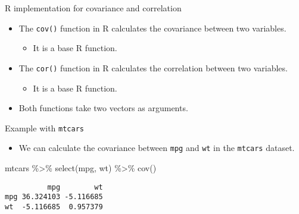 \documentclass[
  10pt,
  ignorenonframetext,
]{beamer}
\newenvironment{Shaded}{\begin{snugshade}}{\end{snugshade}}
\newcommand{\FunctionTok}[1]{\textcolor[rgb]{0.28,0.35,0.67}{#1}}
\newcommand{\NormalTok}[1]{\textcolor[rgb]{0.00,0.23,0.31}{#1}}
\newcommand{\SpecialCharTok}[1]{\textcolor[rgb]{0.37,0.37,0.37}{#1}}
\providecommand{\tightlist}{%
  \setlength{\itemsep}{0pt}\setlength{\parskip}{0pt}}\usepackage{longtable,booktabs,array}
\begin{document}
\begin{frame}[fragile]{R implementation for covariance and correlation}
\label{r-implementation-for-covariance-and-correlation}
\begin{itemize}
\tightlist
\item
  The \texttt{cov()} function in R calculates the covariance between two
  variables.

  \begin{itemize}
  \tightlist
  \item
    It is a base R function.
  \end{itemize}
\item
  The \texttt{cor()} function in R calculates the correlation between
  two variables.

  \begin{itemize}
  \tightlist
  \item
    It is a base R function.
  \end{itemize}
\item
  Both functions take two vectors as arguments.
\end{itemize}
\end{frame}

\begin{frame}[fragile]{Example with \texttt{mtcars}}
\label{example-with-mtcars}
\begin{itemize}
\tightlist
\item
  We can calculate the covariance between \texttt{mpg} and \texttt{wt}
  in the \texttt{mtcars} dataset.
\end{itemize}

\begin{Shaded}
\begin{Highlighting}[]
\NormalTok{mtcars }\SpecialCharTok{\%\textgreater{}\%} 
    \FunctionTok{select}\NormalTok{(mpg, wt) }\SpecialCharTok{\%\textgreater{}\%} 
    \FunctionTok{cov}\NormalTok{()}
\end{Highlighting}
\end{Shaded}

\begin{verbatim}
          mpg        wt
mpg 36.324103 -5.116685
wt  -5.116685  0.957379
\end{verbatim}
\end{frame}
\end{document}
